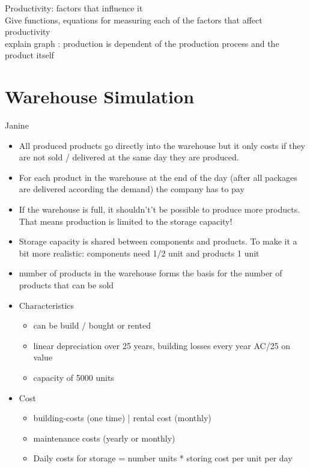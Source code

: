 \documentclass[11pt,titlepage,oneside,openany]{book}
\begin{document}
Productivity: factors that influence it \\
Give functions, equations for measuring each of the factors that affect productivity \\
explain graph : production is dependent of the production process and the product itself 

\section{Warehouse Simulation}
Janine \\
\begin{itemize}
    \item All produced products go directly into the warehouse but it only costs if they are not sold / delivered at the same day they are produced.
    \item For each product in the warehouse at the end of the day (after all packages are delivered according the demand) the company has to pay
    \item If the warehouse is full, it shouldn't’t be possible to produce more products. That means production is limited to the storage capacity! 
    \item Storage capacity is shared between components and products. To make it a bit more realistic: components need 1/2 unit and products 1 unit
    \item number of products in the warehouse forms the basis for the number of products that can be sold
    \item Characteristics 
    \begin{itemize}
        \item can be build / bought or rented
        \item linear depreciation over 25 years, building losses every year AC/25 on value 
        \item capacity of 5000 units
    \end{itemize}
    \item Cost 
    \begin{itemize}
        \item building-costs (one time) | rental cost (monthly)
        \item maintenance costs (yearly or monthly) 
        \item Daily costs for storage = number units * storing cost per unit per day
    \end{itemize}
\end{itemize}
\end{document}
